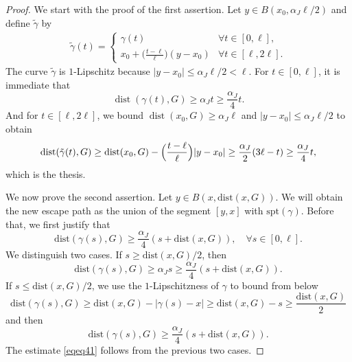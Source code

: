 \documentclass[10pt,a4paper]{amsart}
\DeclareMathOperator{\dist}{dist}
\newcommand{\abs}[1]{\lvert #1 \rvert}
\begin{document}
\begin{proof}  We start with the proof of the first assertion. Let $y \in B(x_0, \alpha_J \ell/2)$ and define $\tilde{\gamma}$ by
    \begin{align*}
        \tilde{\gamma}(t)=
        \begin{cases}
            \gamma(t)                                        &\forall t\in[0,\ell],\\
            x_0 + \bigl(\frac{t - \ell}{\ell}\bigr) (y-x_0)  &\forall t\in[\ell,2\ell].
        \end{cases}
    \end{align*}
    The curve $\tilde{\gamma}$ is $1$-Lipschitz because $\abs{y - x_0} \leq \alpha_J \ell / 2 < \ell$.
    For $t\in[0,\ell]$, it is immediate that 
    \begin{equation} 
        \dist(\gamma(t),G)\geq \alpha_J t \geq \frac{\alpha_J}{4} t.
    \end{equation}
    And for $t\in [\ell,2\ell]$, we bound $\dist(x_0,G) \geq \alpha_J \ell$ and $\abs{y - x_0} \leq \alpha_J \ell/2$ to obtain
    \begin{align*}
        \dist(\tilde{\gamma}(t),G)\geq \dist(x_0,G) - \Bigl(\frac{t-\ell}{\ell}\Bigr)|y-x_0|\geq
        \frac{\alpha_J}{2}(3\ell - t) \geq \frac{\alpha_J}{4}t,
    \end{align*}
    which is the thesis. 

    \medskip


    We now prove the second assertion. Let $y\in B(x,\mathrm{dist}(x,G))$. We will obtain the new escape path as  the
    union of the segment $[y,x]$ with $\mathrm{spt}(\gamma)$. Before that, we first justify that 
    \begin{equation}
        \label{eqeq41}
        \mathrm{dist}(\gamma(s),G)\geq\frac{\alpha_J}{4}(s+\mathrm{dist}(x,G)),\quad\forall s\in[0,\ell].
    \end{equation}
    We distinguish two cases. If $s\geq \mathrm{dist}(x,G)/2$, then 
    \begin{equation}
        \mathrm{dist}(\gamma(s),G)\geq\alpha_Js \geq \frac{\alpha_J}{4}(s+\mathrm{dist}(x,G)).
    \end{equation}
    If $s \leq \mathrm{dist}(x,G)/2$, we use the $1$-Lipschitzness of $\gamma$ to bound from below
    \begin{equation}
        \mathrm{dist}(\gamma(s),G)
        \geq \mathrm{dist}(x,G)-|\gamma(s)-x|
        \geq \mathrm{dist}(x,G)-s \geq \frac{\mathrm{dist}(x,G)}{2}
    \end{equation}
    and then
    \begin{equation}
        \mathrm{dist}(\gamma(s),G)
        \geq \frac{\alpha_J}{4}(s+\mathrm{dist}(x,G)).
    \end{equation}
    The estimate \eqref{eqeq41} follows from the previous two cases.


\end{proof}
\end{document}
